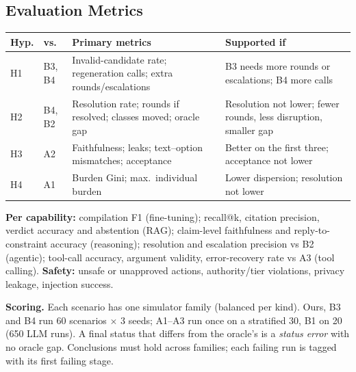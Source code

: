 \documentclass[11pt,a4paper]{article}
\begin{document}
\subsection{Evaluation Metrics}
\begin{table}[H]
\centering\small
\begin{tabularx}{\textwidth}{@{}l l Y Y@{}}
\toprule
\textbf{Hyp.} & \textbf{vs.} & \textbf{Primary metrics} & \textbf{Supported if}\\
\midrule
H1 & B3, B4 & Invalid-candidate rate; regeneration calls; extra rounds/escalations & B3 needs more rounds or escalations; B4 more calls\\
H2 & B4, B2 & Resolution rate; rounds if resolved; classes moved; oracle gap & Resolution not lower; fewer rounds, less disruption, smaller gap\\
H3 & A2 & Faithfulness; leaks; text--option mismatches; acceptance & Better on the first three; acceptance not lower\\
H4 & A1 & Burden Gini; max.\ individual burden & Lower dispersion; resolution not lower\\
\bottomrule
\end{tabularx}
\end{table}
\noindent\textbf{Per capability:} compilation F1 (fine-tuning);
recall@k, citation precision, verdict accuracy and abstention (RAG);
claim-level faithfulness and reply-to-constraint accuracy (reasoning);
resolution and escalation precision vs B2 (agentic); tool-call accuracy,
argument validity, error-recovery rate vs A3 (tool calling). \textbf{Safety:}
unsafe or unapproved actions, authority/tier violations, privacy leakage,
injection success.

\smallskip\textbf{Scoring.} Each scenario has one simulator family (balanced
per kind). Ours, B3 and B4 run 60 scenarios $\times$ 3 seeds; A1--A3 run once on
a stratified 30, B1 on 20 (650 LLM runs). A final status that differs from the
oracle's is a \emph{status error} with no oracle gap. Conclusions must hold
across families; each failing run is tagged with its first failing stage.

\end{document}
